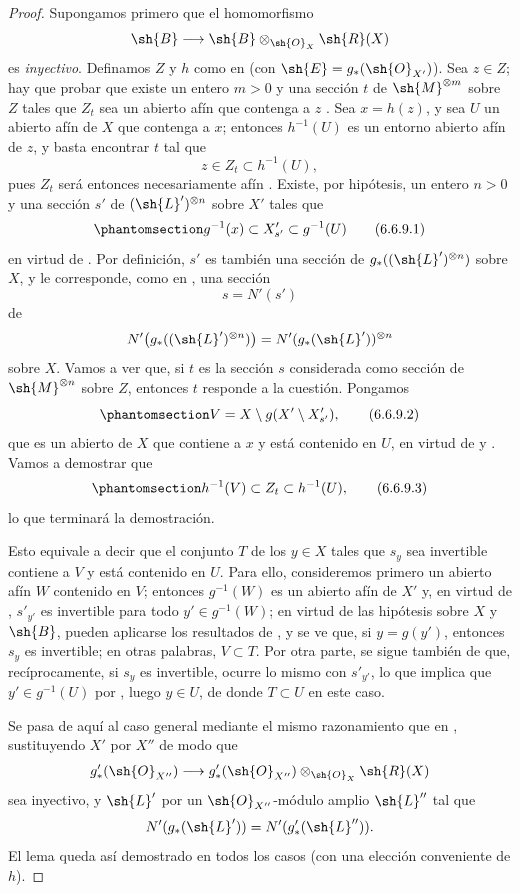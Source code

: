 \documentclass[oneside,10pt]{amsart}
\makeatletter
\newcommand{\ega@arrow}[2]{\mathchoice{#1}{#2}{#2}{#2}}
\renewcommand{\to}{\ega@arrow{\longrightarrow}{\rightarrow}}
\newcommand{\oldpage}[2][]{\marginnote{\normalfont\footnotesize\textbf{#1}~|~#2}\ignorespaces}
\let\EGAOriginalLabel\label
\renewcommand{\label}[1]{\phantomsection\EGAOriginalLabel{#1}}
\makeatother
\begin{document}
\begin{proof}
Supongamos primero que el homomorfismo
\[
  \sh{B}\to\sh{B}\otimes_{\sh{O}_X}\sh{R}(X)
\]
es \emph{inyectivo}.
Definamos $Z$ y $h$ como en  (con $\sh{E}=g_*(\sh{O}_{X'})$).
Sea $z\in Z$;
hay que probar que existe un entero $m>0$ y una sección $t$ de $\sh{M}^{\otimes m}$ sobre $Z$ tales que $Z_t$ sea un abierto afín que contenga a $z$ .
Sea $x=h(z)$, y sea $U$ un abierto afín de $X$ que contenga a $x$;
entonces $h^{-1}(U)$ es un entorno abierto afín de $z$, y basta encontrar $t$ tal que
\[
  z\in Z_t\subset h^{-1}(U),
\]
pues $Z_t$ será entonces necesariamente afín .
Existe, por hipótesis, un entero $n>0$ y una sección $s'$ de $({\sh{L}'})^{\otimes n}$ sobre $X'$ tales que
\[
\label{II.6.6.9.1}
  g^{-1}(x)\subset X'_{s'}\subset g^{-1}(U)
\tag{6.6.9.1}
\]
en virtud de .
Por definición, $s'$ es también una sección de $g_*(({\sh{L}'})^{\otimes n})$ sobre $X$, y le corresponde, como en , una sección
\[
  s=N'(s')
\]
de
\[
  N'\bigl(g_*(({\sh{L}'})^{\otimes n})\bigr)
  =N'(g_*(\sh{L}'))^{\otimes n}
\]
sobre $X$.
\oldpage[II]{134}
Vamos a ver que, si $t$ es la sección $s$ considerada como sección de $\sh{M}^{\otimes n}$ sobre $Z$, entonces $t$ responde a la cuestión.
Pongamos
\[
\label{II.6.6.9.2}
  V=X\setminus g(X'\setminus X'_{s'}),
\tag{6.6.9.2}
\]
que es un abierto de $X$ que contiene a $x$ y está contenido en $U$, en virtud de  y .
Vamos a demostrar que
\[
\label{II.6.6.9.3}
  h^{-1}(V)\subset Z_t\subset h^{-1}(U),
\tag{6.6.9.3}
\]
lo que terminará la demostración.

Esto equivale a decir que el conjunto $T$ de los $y\in X$ tales que $s_y$ sea invertible contiene a $V$ y está contenido en $U$.
Para ello, consideremos primero un abierto afín $W$ contenido en $V$;
entonces $g^{-1}(W)$ es un abierto afín de $X'$ y, en virtud de , $s'_{y'}$ es invertible para todo $y'\in g^{-1}(W)$;
en virtud de las hipótesis sobre $X$ y $\sh{B}$, pueden aplicarse los resultados de , y se ve que, si $y=g(y')$, entonces $s_y$ es invertible;
en otras palabras, $V\subset T$.
Por otra parte, se sigue también de  que, recíprocamente, si $s_y$ es invertible, ocurre lo mismo con $s'_{y'}$, lo que implica que $y'\in g^{-1}(U)$ por , luego $y\in U$, de donde $T\subset U$ en este caso.

Se pasa de aquí al caso general mediante el mismo razonamiento que en , sustituyendo $X'$ por $X''$ de modo que
\[
  g'_*(\sh{O}_{X''})\to
  g'_*(\sh{O}_{X''})\otimes_{\sh{O}_X}\sh{R}(X)
\]
sea inyectivo, y $\sh{L}'$ por un $\sh{O}_{X''}$-módulo amplio $\sh{L}''$ tal que
\[
  N'(g_*(\sh{L}'))=N'(g'_*(\sh{L}'')).
\]
El lema  queda así demostrado en todos los casos (con una elección conveniente de $h$).
\end{proof}
\end{document}
